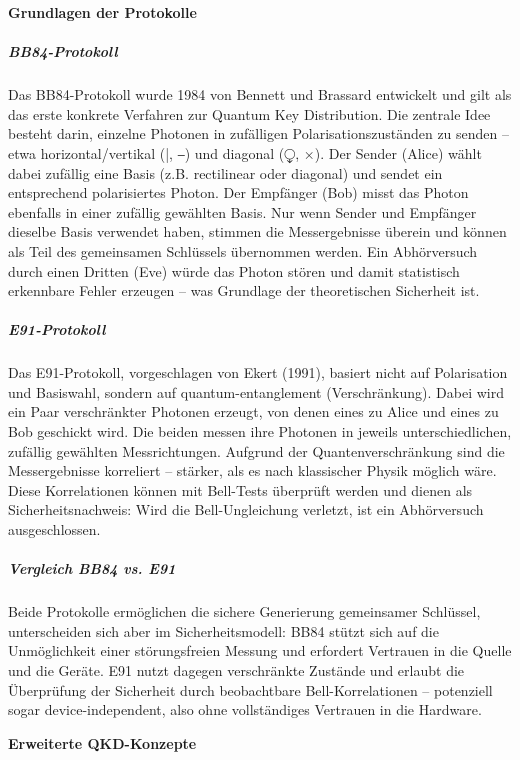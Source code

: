 \vspace{1em}
\noindent\textbf{Grundlagen der Protokolle}

\subparagraph{BB84-Protokoll}
Das BB84-Protokoll wurde 1984 von Bennett und Brassard entwickelt und gilt als das erste konkrete Verfahren zur Quantum Key Distribution. Die zentrale Idee besteht darin, einzelne Photonen in zufälligen Polarisationszuständen zu senden – etwa horizontal/vertikal (|, ⎯) und diagonal (⧬, ×).
Der Sender (Alice) wählt dabei zufällig eine Basis (z.B. rectilinear oder diagonal) und sendet ein entsprechend polarisiertes Photon. Der Empfänger (Bob) misst das Photon ebenfalls in einer zufällig gewählten Basis. Nur wenn Sender und Empfänger dieselbe Basis verwendet haben, stimmen die Messergebnisse überein und können als Teil des gemeinsamen Schlüssels übernommen werden.
Ein Abhörversuch durch einen Dritten (Eve) würde das Photon stören und damit statistisch erkennbare Fehler erzeugen – was Grundlage der theoretischen Sicherheit ist. \cite{bennett_et_al_quantum_1984}
 
\subparagraph{E91-Protokoll}
Das E91-Protokoll, vorgeschlagen von Ekert (1991), basiert nicht auf Polarisation und Basiswahl, sondern auf quantum-entanglement (Verschränkung). Dabei wird ein Paar verschränkter Photonen erzeugt, von denen eines zu Alice und eines zu Bob geschickt wird.
Die beiden messen ihre Photonen in jeweils unterschiedlichen, zufällig gewählten Messrichtungen. Aufgrund der Quantenverschränkung sind die Messergebnisse korreliert – stärker, als es nach klassischer Physik möglich wäre. Diese Korrelationen können mit Bell-Tests überprüft werden und dienen als Sicherheitsnachweis: Wird die Bell-Ungleichung verletzt, ist ein Abhörversuch ausgeschlossen. \cite{ekert_et_al_quantum_1991}

\subparagraph{Vergleich BB84 vs. E91}
Beide Protokolle ermöglichen die sichere Generierung gemeinsamer Schlüssel, unterscheiden sich aber im Sicherheitsmodell:
BB84 stützt sich auf die Unmöglichkeit einer störungsfreien Messung und erfordert Vertrauen in die Quelle und die Geräte.
E91 nutzt dagegen verschränkte Zustände und erlaubt die Überprüfung der Sicherheit durch beobachtbare Bell-Korrelationen – potenziell sogar device-independent, also ohne vollständiges Vertrauen in die Hardware.

\vspace{1em}
\noindent\textbf{Erweiterte QKD-Konzepte}

